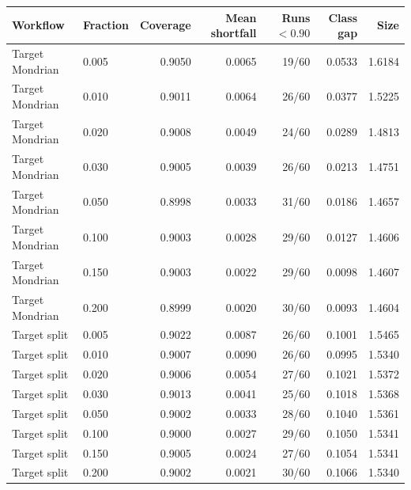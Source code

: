 \begin{tabular}{llrrrrr}
\toprule
Workflow & Fraction & Coverage & Mean shortfall & Runs $<0.90$ & Class gap & Size \\
\midrule
Target Mondrian & 0.005 & 0.9050 & 0.0065 & 19/60 & 0.0533 & 1.6184 \\
Target Mondrian & 0.010 & 0.9011 & 0.0064 & 26/60 & 0.0377 & 1.5225 \\
Target Mondrian & 0.020 & 0.9008 & 0.0049 & 24/60 & 0.0289 & 1.4813 \\
Target Mondrian & 0.030 & 0.9005 & 0.0039 & 26/60 & 0.0213 & 1.4751 \\
Target Mondrian & 0.050 & 0.8998 & 0.0033 & 31/60 & 0.0186 & 1.4657 \\
Target Mondrian & 0.100 & 0.9003 & 0.0028 & 29/60 & 0.0127 & 1.4606 \\
Target Mondrian & 0.150 & 0.9003 & 0.0022 & 29/60 & 0.0098 & 1.4607 \\
Target Mondrian & 0.200 & 0.8999 & 0.0020 & 30/60 & 0.0093 & 1.4604 \\
Target split & 0.005 & 0.9022 & 0.0087 & 26/60 & 0.1001 & 1.5465 \\
Target split & 0.010 & 0.9007 & 0.0090 & 26/60 & 0.0995 & 1.5340 \\
Target split & 0.020 & 0.9006 & 0.0054 & 27/60 & 0.1021 & 1.5372 \\
Target split & 0.030 & 0.9013 & 0.0041 & 25/60 & 0.1018 & 1.5368 \\
Target split & 0.050 & 0.9002 & 0.0033 & 28/60 & 0.1040 & 1.5361 \\
Target split & 0.100 & 0.9000 & 0.0027 & 29/60 & 0.1050 & 1.5341 \\
Target split & 0.150 & 0.9005 & 0.0024 & 27/60 & 0.1054 & 1.5341 \\
Target split & 0.200 & 0.9002 & 0.0021 & 30/60 & 0.1066 & 1.5340 \\
\bottomrule
\end{tabular}
